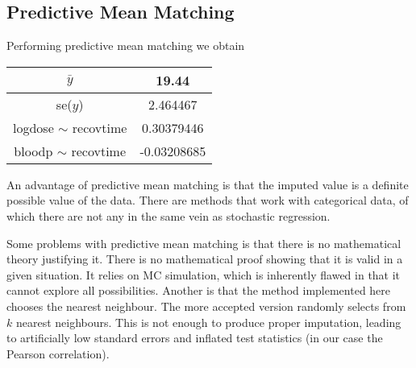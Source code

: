 \documentclass[11pt]{article}
\begin{document}
\subsection*{Predictive Mean Matching}

Performing predictive mean matching we obtain 

\begin{table}[H]
	\centering
	\begin{tabular}{|c|c|}
		\hline 
		$\bar{y}$ & 19.44\\ 
		\hline 
		se($y$) & 2.464467\\ 
		\hline 
		logdose $\sim$ recovtime & 0.30379446\\ 
		\hline 
		bloodp $\sim$ recovtime & -0.03208685\\ 
		\hline 
	\end{tabular} 
\end{table}

An advantage of predictive mean matching is that the imputed value is a definite possible value of the data. There are methods that work with categorical data, of which there are not any in the same vein as stochastic regression. 

Some problems with predictive mean matching is that there is no mathematical theory justifying it. There is no mathematical proof showing that it is valid in a given situation. It relies on MC simulation, which is inherently flawed in that it cannot explore all possibilities. Another is that the method implemented here chooses the nearest neighbour. The more accepted version randomly selects from $k$ nearest neighbours. This is not enough to produce proper imputation, leading to artificially low standard errors and inflated test statistics (in our case the Pearson correlation). 
\end{document}

